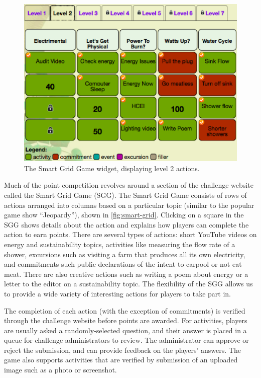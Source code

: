 \documentclass[10pt, conference, compsocconf]{IEEEtran-old}
\begin{document}
\begin{figure}[!tb]
	\centering
	\includegraphics[width=\columnwidth]{smart-grid2.eps}
	\caption{The Smart Grid Game widget, displaying level 2 actions.}
	\label{fig:smart-grid}
\end{figure}

Much of the point competition revolves around a section of the challenge website called the Smart Grid Game (SGG). The Smart Grid Game consists of rows of actions arranged into columns based on a particular topic (similar to the popular game show ``Jeopardy''), shown in \autoref{fig:smart-grid}. Clicking on a square in the SGG shows details about the action and explains how players can complete the action to earn points. There are several types of actions: short YouTube videos on energy and sustainability topics, activities like measuring the flow rate of a shower, excursions such as visiting a farm that produces all its own electricity, and commitments such public declarations of the intent to carpool or not eat meat. There are also creative actions such as writing a poem about energy or a letter to the editor on a sustainability topic. The flexibility of the SGG allows us to provide a wide variety of interesting actions for players to take part in.

The completion of each action (with the exception of commitments) is verified through the challenge website before points are awarded. For activities, players are usually asked a randomly-selected question, and their answer is placed in a queue for challenge administrators to review. The administrator can approve or reject the submission, and can provide feedback on the players' answers. The game also supports activities that are verified by submission of an uploaded image such as a photo or screenshot.
\end{document}
